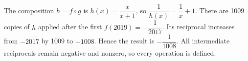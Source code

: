 The composition $h=f\circ g$ is $h(x)=\dfrac{x}{x+1}$, so $\dfrac{1}{h(x)}=\dfrac{1}{x}+1$. There are 1009 copies of $h$ applied after the first $f(2019)=-\dfrac{1}{2017}$. Its reciprocal increases from $-2017$ by 1009 to $-1008$. Hence the result is $\boxed{-\dfrac{1}{1008}}$. All intermediate reciprocals remain negative and nonzero, so every operation is defined.

